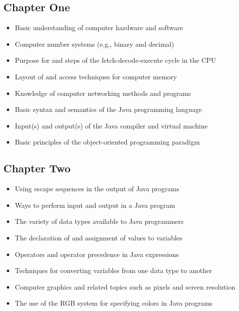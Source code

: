 \documentclass[11pt]{article}
\begin{document}
\subsection*{Chapter One}

\begin{itemize}

  \item Basic understanding of computer hardware and software
  \item Computer number systems (e.g., binary and decimal)
  \item Purpose for and steps of the fetch-decode-execute cycle in the CPU
  \item Layout of and access techniques for computer memory
  \item Knowledge of computer networking methods and programs
  \item Basic syntax and semantics of the Java programming language
  \item Input(s) and output(s) of the Java compiler and virtual machine
  \item Basic principles of the object-oriented programming paradigm

\end{itemize}

\subsection*{Chapter Two}

\begin{itemize}

  \item Using escape sequences in the output of Java programs
  \item Ways to perform input and output in a Java program
  \item The variety of data types available to Java programmers
  \item The declaration of and assignment of values to variables
  \item Operators and operator precedence in Java expressions
  \item Techniques for converting variables from one data type to another
  \item Computer graphics and related topics such as pixels and screen resolution
  \item The use of the RGB system for specifying colors in Java programs

\end{itemize}
\end{document}
